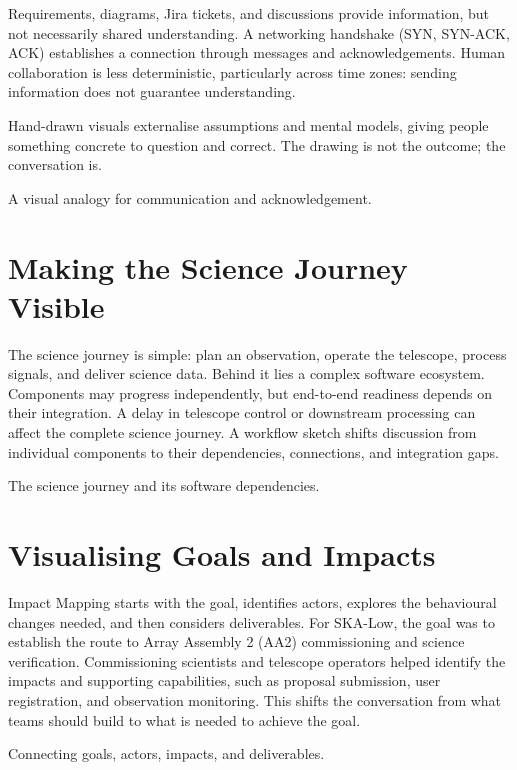 \documentclass[11pt,twoside]{article}
\begin{document}
Requirements, diagrams, Jira tickets, and discussions provide
information, but not necessarily shared understanding. A
networking handshake (SYN, SYN-ACK, ACK) establishes a
connection through messages and acknowledgements. Human
collaboration is less deterministic, particularly across time
zones: sending information does not guarantee understanding.

Hand-drawn visuals externalise assumptions and mental models,
giving people something concrete to question and correct.
The drawing is not the outcome; the conversation is.

{A visual analogy for communication and acknowledgement.}


\section{Making the Science Journey Visible}

The science journey is simple: plan an observation, operate
the telescope, process signals, and deliver science data.
Behind it lies a complex software ecosystem. Components may
progress independently, but end-to-end readiness depends on
their integration. A delay in telescope control or downstream
processing can affect the complete science journey.
A workflow sketch shifts discussion from individual components
to their dependencies, connections, and integration gaps.

{The science journey and its software dependencies.}


\section{Visualising Goals and Impacts}

Impact Mapping starts with the goal, identifies actors, explores
the behavioural changes needed, and then considers deliverables.
For SKA-Low, the goal was to establish the route to Array
Assembly 2 (AA2) commissioning and science verification.
Commissioning scientists and telescope operators helped identify
the impacts and supporting capabilities, such as proposal
submission, user registration, and observation monitoring.
This shifts the conversation from what teams should build to
what is needed to achieve the goal.

{Connecting goals, actors, impacts, and deliverables.}
\end{document}
